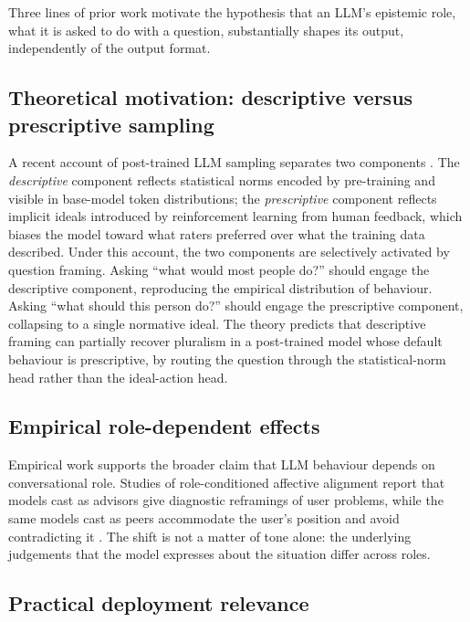 Three lines of prior work motivate the hypothesis that an LLM's
epistemic role, what it is asked to do with a question, substantially
shapes its output, independently of the output format.

\subsection*{Theoretical motivation: descriptive versus prescriptive sampling}

A recent account of post-trained LLM sampling separates two components
\citep{sivaprasad-2025-descriptive-prescriptive}. The \emph{descriptive}
component reflects statistical norms encoded by pre-training and visible
in base-model token distributions; the \emph{prescriptive} component
reflects implicit ideals introduced by reinforcement learning from human
feedback, which biases the model toward what raters preferred over what
the training data described. Under this account, the two components are
selectively activated by question framing. Asking ``what would most
people do?'' should engage the descriptive component, reproducing the
empirical distribution of behaviour. Asking ``what should this person
do?'' should engage the prescriptive component, collapsing to a single
normative ideal. The theory predicts that descriptive framing can
partially recover pluralism in a post-trained model whose default
behaviour is prescriptive, by routing the question through the
statistical-norm head rather than the ideal-action head.

\subsection*{Empirical role-dependent effects}

Empirical work supports the broader claim that LLM behaviour depends on
conversational role. Studies of role-conditioned affective alignment
report that models cast as advisors give diagnostic reframings of user
problems, while the same models cast as peers accommodate the user's
position and avoid contradicting it \citep{personalization-2026-affective-alignment}.
The shift is not a matter of tone alone: the underlying judgements that
the model expresses about the situation differ across roles.

\subsection*{Practical deployment relevance}

